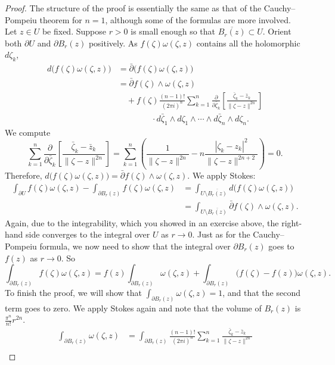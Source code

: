 \begin{proof}
The structure of the proof is essentially the same as that of the Cauchy--Pompeiu theorem for $n=1$, although some of the formulas are more involved. Let $z\in U$ be fixed. Suppose $r>0$ is small enough so that $\overline{B_r(z)}\subset U$. Orient both $\partial U$ and $\partial B_r(z)$ positively. As $f(\zeta)\omega(\zeta,z)$ contains all the holomorphic $d\zeta_k$,
\begin{align*}
d\bigl(f(\zeta)\omega(\zeta,z)\bigr)&=\bar\partial\bigl(f(\zeta)\omega(\zeta,z)\bigr)\\
&=\bar\partial f(\zeta)\wedge\omega(\zeta,z)\\
&\quad+f(\zeta)\frac{(n-1)!}{(2\pi i)^n}\sum_{k=1}^n\frac{\partial}{\partial\bar\zeta_k}\left[\frac{\bar\zeta_k-\bar z_k}{\|\zeta-z\|^{2n}}\right]\\
&\qquad\qquad\cdot d\bar\zeta_1\wedge d\zeta_1\wedge\cdots\wedge d\bar\zeta_n\wedge d\zeta_n.
\end{align*}
We compute
\[
\sum_{k=1}^n\frac{\partial}{\partial\bar\zeta_k}\left[\frac{\bar\zeta_k-\bar z_k}{\|\zeta-z\|^{2n}}\right]=\sum_{k=1}^n\left(\frac1{\|\zeta-z\|^{2n}}-n\frac{|\zeta_k-z_k|^2}{\|\zeta-z\|^{2n+2}}\right)=0.
\]
Therefore, $d\bigl(f(\zeta)\omega(\zeta,z)\bigr)=\bar\partial f(\zeta)\wedge\omega(\zeta,z)$. We apply Stokes:
\begin{align*}
\int_{\partial U}f(\zeta)\omega(\zeta,z)-\int_{\partial B_r(z)}f(\zeta)\omega(\zeta,z)
&=\int_{U\setminus\overline{B_r(z)}}d\bigl(f(\zeta)\omega(\zeta,z)\bigr)\\
&=\int_{U\setminus\overline{B_r(z)}}\bar\partial f(\zeta)\wedge\omega(\zeta,z).
\end{align*}
Again, due to the integrability, which you showed in an exercise above, the right-hand side converges to the integral over $U$ as $r\to0$. Just as for the Cauchy--Pompeiu formula, we now need to show that the integral over $\partial B_r(z)$ goes to $f(z)$ as $r\to0$. So
\[
\int_{\partial B_r(z)}f(\zeta)\omega(\zeta,z)=f(z)\int_{\partial B_r(z)}\omega(\zeta,z)+\int_{\partial B_r(z)}\bigl(f(\zeta)-f(z)\bigr)\omega(\zeta,z).
\]
To finish the proof, we will show that $\int_{\partial B_r(z)}\omega(\zeta,z)=1$, and that the second term goes to zero. We apply Stokes again and note that the volume of $B_r(z)$ is $\frac{\pi^n}{n!}r^{2n}$.
\begin{align*}
\int_{\partial B_r(z)}\omega(\zeta,z)
&=\int_{\partial B_r(z)}\frac{(n-1)!}{(2\pi i)^n}\sum_{k=1}^n\frac{\bar\zeta_k-\bar z_k}{\|\zeta-z\|^{2n}}\\

\end{align*}
\end{proof}
